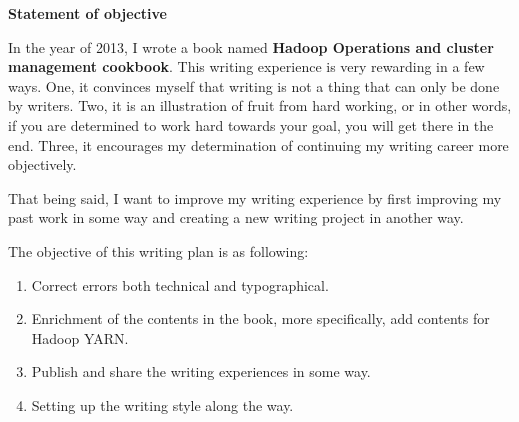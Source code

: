 \documentclass{article}
\begin{document}
\textbf{\LARGE Statement of objective} 

In the year of 2013, I wrote a book named \textbf{Hadoop Operations and cluster management cookbook}. This writing experience is very rewarding in a few ways. One, it convinces myself that writing is not a thing that can only be done by writers. Two, it is an illustration of fruit from hard working, or in other words, if you are determined to work hard towards your goal, you will get there in the end. Three, it encourages my determination of continuing my writing career more objectively.

That being said, I want to improve my writing experience by first improving my past work in some way and creating a new writing project in another way. 

The objective of this writing plan is as following: 
\begin{enumerate} 
  \item Correct errors both technical and typographical. 
  \item Enrichment of the contents in the book, more specifically, add contents for Hadoop YARN. 
  \item Publish and share the writing experiences in some way. 
  \item Setting up the writing style along the way. 
\end{enumerate}
\end{document}
